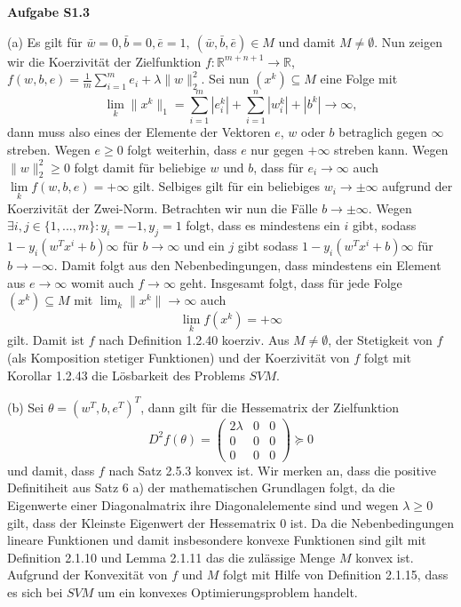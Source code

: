 \documentclass[ngerman, a4paper,12pt]{article}
\begin{document}
\textbf{Aufgabe S1.3} \par
(a) Es gilt für $\bar{w}=0, \bar{b}=0, \bar{e}=1, \ (\bar{w}, \bar{b}, \bar{e}) \in M$ und damit $M\neq \emptyset$. Nun zeigen wir die Koerzivität der Zielfunktion $f: \mathbb{R}^{m+n+1} \rightarrow \mathbb{R}$, $f(w,b,e) = \frac{1}{m} \sum_{i=1}^{m}e_i + \lambda \|w \|_2^2$. Sei nun $(x^k) \subseteq M$ eine Folge mit 
\begin{equation}
	\lim\limits_{k} \| x^k \|_1 = \sum_{i=1}^{m}|e_i^k| + \sum_{i=1}^{n} |w_i^k| + |b^k|  \rightarrow \infty,
\end{equation}
dann muss also eines der Elemente der Vektoren $e$, $w$ oder $b$ betraglich gegen $\infty$ streben. Wegen $e \geq 0$ folgt weiterhin, dass $e$ nur gegen $+ \infty$ streben kann. Wegen $\| w \|_2^2 \geq 0$ folgt damit für beliebige $w$ und $b$, dass für $e_i \rightarrow \infty$ auch $\lim\limits_{k} f(w, b, e) = + \infty$ gilt. Selbiges gilt für ein beliebiges $w_i \rightarrow \pm \infty$ aufgrund der Koerzivität der Zwei-Norm. Betrachten wir nun die Fälle $b \rightarrow \pm \infty$. Wegen $\exists i,j \in \{1,...,m \} : y_i = -1, y_j = 1$ folgt, dass es mindestens ein $i$ gibt, sodass $1 - y_i (w^Tx^i + b) \infty$ für $b \rightarrow \infty$ und ein $j$ gibt sodass $1 - y_i (w^Tx^i + b) \infty$ für $b \rightarrow -\infty$. Damit folgt aus den Nebenbedingungen, dass mindestens ein Element aus $e \rightarrow \infty$ womit auch $f \rightarrow \infty$ geht. Insgesamt folgt, dass für jede Folge $(x^k) \subseteq M$ mit $\lim_k \| x^k \| \rightarrow \infty$ auch
\begin{equation*}
	\lim\limits_{k} f(x^k) = +\infty
\end{equation*}
gilt. Damit ist $f$ nach Definition 1.2.40 koerziv. Aus $M \neq \emptyset$, der Stetigkeit von $f$ (als Komposition stetiger Funktionen) und der Koerzivität von $f$ folgt mit Korollar 1.2.43 die Lösbarkeit des Problems $SVM$. \par
(b) Sei $\theta = (w^T, b, e^T)^T$, dann gilt für die Hessematrix der Zielfunktion
\begin{equation*}
	D^2 f(\theta) = \begin{pmatrix}
	2\lambda &0 &0 \\
	0 & 0 & 0 \\
	0 & 0 & 0 
	\end{pmatrix} \succeq 0
\end{equation*}
und damit, dass $f$ nach Satz 2.5.3 konvex ist. Wir merken an, dass die positive Definitiheit aus Satz 6 a) der mathematischen Grundlagen folgt, da die Eigenwerte einer Diagonalmatrix ihre Diagonalelemente sind und wegen $\lambda \geq 0$ gilt, dass der Kleinste Eigenwert der Hessematrix $0$ ist. Da die Nebenbedingungen lineare Funktionen und damit insbesondere konvexe Funktionen sind gilt mit Definition 2.1.10 und Lemma 2.1.11 das die zulässige Menge $M$ konvex ist. Aufgrund der Konvexität von $f$ und $M$ folgt mit Hilfe von Definition 2.1.15, dass es sich bei $SVM$ um ein konvexes Optimierungsproblem handelt.
\end{document}
